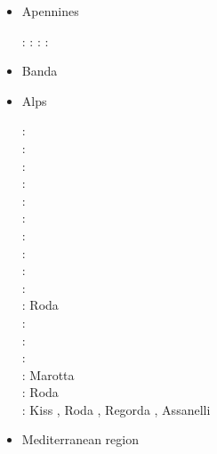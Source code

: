 \begin{itemize}
\item Apennines 

\begin{scriptsize}
\nineteenninetyeight: \cite{buwg98}
\twothousandseven: \cite{shpy07}
\twothousandnine: \cite{rohu09}
\twothousandfifteen: \cite{vami15}
\end{scriptsize}

\item Banda 

\begin{scriptsize}
\cite{rohu09}
\cite{spha10}
\end{scriptsize}


\item Alps 

\begin{scriptsize}
\nineteenninetysix: \cite{beeh96}\\
\nineteenninetyseven: \cite{repe97}\\
\nineteenninetyeight: \cite{desw98}\\
\twothousand: \cite{pfeb00}\\
\twothousandone: \cite{bujl01}\\
\twothousandtwo: \cite{pfsb02}\\
\twothousandthree: \cite{pimo03}\\
\twothousandfive: \cite{buge05}\\
\twothousandseven: \cite{masp07}\\
\twothousandeight: \cite{vifj08}\\
\twothousandtwelve: Roda \etal \cite{rosm12}\\
\twothousandthirteen: \cite{luws13}\cite{baes13}\cite{bubj13}\\
\twothousandfourteen: \cite{bubj14}\\
\twothousandfifteen: \cite{scdu15}\cite{fohk15}\\
\twothousandeighteen: Marotta \etal \cite{marc18}\\
\twothousandnineteen: Roda \etal \cite{rors19}\\
\twothousandtwenty: Kiss \etal \cite{kids20}, Roda \etal \cite{rozr20}, Regorda \etal \cite{relr20},
                    Assanelli \etal \cite{aslr20}
\end{scriptsize}

\item Mediterranean region 


\end{itemize}
